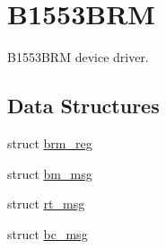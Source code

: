 \hypertarget{group__B1553BRM}{}\section{B1553\+B\+RM}
\label{group__B1553BRM}


B1553\+B\+RM device driver.  


\subsection*{Data Structures}
\begin{DoxyCompactItemize}
\item 
struct \mbox{\hyperlink{structbrm__reg}{brm\+\_\+reg}}
\item 
struct \mbox{\hyperlink{structbm__msg}{bm\+\_\+msg}}
\item 
struct \mbox{\hyperlink{structrt__msg}{rt\+\_\+msg}}
\item 
struct \mbox{\hyperlink{structbc__msg}{bc\+\_\+msg}}
\end{DoxyCompactItemize}
